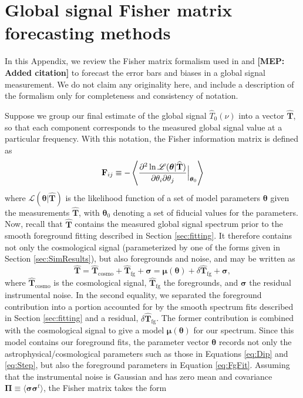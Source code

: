 \documentclass[twocolumn,apj,numberedappendix]{emulateapj}
\newcommand{\F}{\mathbf{F}}
\newcommand{\mep}[1]{{\color{applegreen} \textbf{[MEP:  #1]}}}
\begin{document}
\section{Global signal Fisher matrix forecasting methods}
\label{fisher}
In this Appendix, we review the Fisher matrix formalism used in \citet{Pritchard+Loeb2010} and \citet{BernardiLEDA} \mep{Added citation} to forecast the error bars and biases in a global signal measurement. We do not claim any originality here, and include a description of the formalism only for completeness and consistency of notation.

Suppose we group our final estimate of the global signal $\widehat{T}_0 (\nu)$ into a vector $\widehat{\mathbf{T}}$, so that each component corresponds to the measured global signal value at a particular frequency. With this notation, the Fisher information matrix is defined as
\begin{equation}
\F_{ij} \equiv -\left \langle \frac{\partial^2 \ln \mathscr{L}(\boldsymbol \theta | \widehat{\mathbf{T}})}{\partial \theta_i \partial \theta_j} \Big{|}_{\boldsymbol \theta_0} \right \rangle
\end{equation}
where $\mathscr{L}(\boldsymbol \theta | \widehat{\mathbf{T}})$ is the likelihood function of a set of model parameters $\boldsymbol \theta$ given the measurements $\widehat{\mathbf{T}}$, with $\boldsymbol \theta_0$ denoting a set of fiducial values for the parameters. Now, recall that $\widehat{\mathbf{T}}$ contains the measured global signal spectrum prior to the smooth foreground fitting described in Section \ref{sec:fitting}. It therefore contains not only the cosmological signal (parameterized by one of the forms given in Section \ref{sec:SimResults}), but also foregrounds and noise, and may be written as
\begin{equation}
\widehat{\mathbf{T}}= \widehat{\mathbf{T}} _\textrm{cosmo} + \widehat{\mathbf{T}}_\textrm{fg} + \boldsymbol \sigma = \boldsymbol \mu (\boldsymbol \theta) +\delta \widehat{\mathbf{T}}_\textrm{fg} + \boldsymbol \sigma,
\end{equation}
where $\widehat{\mathbf{T}} _\textrm{cosmo}$ is the cosmological signal, $\widehat{\mathbf{T}}_\textrm{fg}$ the foregrounds, and $\boldsymbol \sigma$ the residual instrumental noise. In the second equality, we separated the foreground contribution into a portion accounted for by the smooth spectrum fits described in Section \ref{sec:fitting} and a residual, $\delta \widehat{\mathbf{T}}_\textrm{fg}$. The former contribution is combined with the cosmological signal to give a model $\boldsymbol \mu (\boldsymbol \theta)$ for our spectrum. Since this model contains our foreground fits, the parameter vector $\boldsymbol \theta$ records not only the astrophysical/cosmological parameters such as those in Equations \eqref{eq:Dip} and \eqref{eq:Step}, but also the foreground parameters in Equation \eqref{eq:FgFit}. Assuming that the instrumental noise is Gaussian and has zero mean and covariance $\boldsymbol \Pi \equiv \langle \boldsymbol \sigma \boldsymbol \sigma^t \rangle$, the Fisher matrix takes the form
\end{document}
